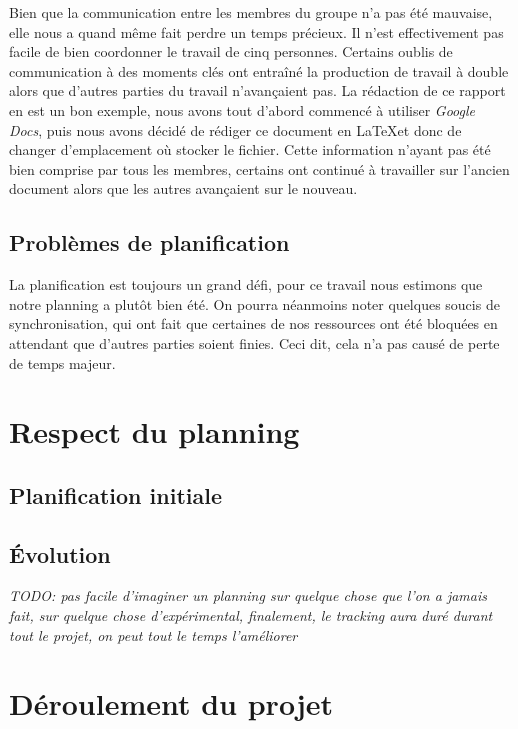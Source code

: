 \documentclass[11pt,a4paper,oldfontcommands]{memoir}
\begin{document}
Bien que la communication entre les membres du groupe n'a pas été mauvaise, elle nous a quand même fait perdre un temps précieux. Il n'est effectivement pas facile de bien coordonner le travail de cinq personnes. Certains oublis de communication à des moments clés ont entraîné la production de travail à double alors que d'autres parties du travail n'avançaient pas. La rédaction de ce rapport en est un bon exemple, nous avons tout d'abord commencé à utiliser \textit{Google Docs}, puis nous avons décidé de rédiger ce document en \LaTeX et donc de changer d'emplacement où stocker le fichier. Cette information n'ayant pas été bien comprise par tous les membres, certains ont continué à travailler sur l'ancien document alors que les autres avançaient sur le nouveau.

\subsection{Problèmes de planification}

La planification est toujours un grand défi, pour ce travail nous estimons que notre planning a plutôt bien été. On pourra néanmoins noter quelques soucis de synchronisation, qui ont fait que certaines de nos ressources ont été bloquées en attendant que d'autres parties soient finies. Ceci dit, cela n'a pas causé de perte de temps majeur.

\section{Respect du planning}

\subsection{Planification initiale}

\subsection{Évolution}

\textit{TODO: pas facile d'imaginer un planning sur quelque chose que l'on a jamais fait, sur quelque chose d'expérimental, finalement, le tracking aura duré durant tout le projet, on peut tout le temps l'améliorer}

\section{Déroulement du projet}
\end{document}
